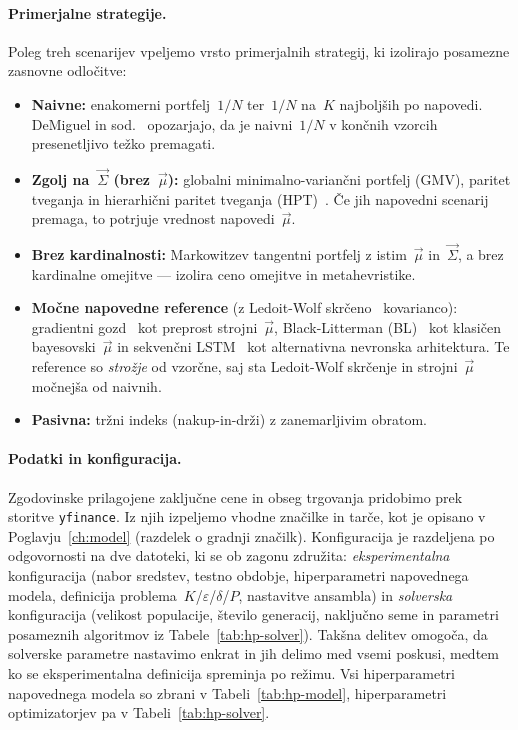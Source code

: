 \paragraph{Primerjalne strategije.}\label{sec:baselines}
Poleg treh scenarijev vpeljemo vrsto primerjalnih strategij, ki izolirajo posamezne zasnovne odločitve:
\begin{itemize}
  \item \textbf{Naivne:} enakomerni portfelj~$1/N$ ter~$1/N$ na~$K$ najboljših po napovedi. DeMiguel in sod.~\cite{demiguel2009} opozarjajo, da je naivni~$1/N$ v končnih vzorcih presenetljivo težko premagati.
  \item \textbf{Zgolj na~$\vec{\Sigma}$ (brez~$\vec{\mu}$):} globalni minimalno-variančni portfelj (GMV), paritet tveganja in hierarhični paritet tveganja (HPT)~\cite{lopezdeprado2016}. Če jih napovedni scenarij premaga, to potrjuje vrednost napovedi~$\vec{\mu}$.
  \item \textbf{Brez kardinalnosti:} Markowitzev tangentni portfelj z istim~$\vec{\mu}$ in~$\vec{\Sigma}$, a brez kardinalne omejitve --- izolira ceno omejitve in metahevristike.
  \item \textbf{Močne napovedne reference} (z Ledoit-Wolf skrčeno~\cite{ledoit2004} kovarianco): gradientni gozd~\cite{ke2017lightgbm} kot preprost strojni~$\vec{\mu}$, Black-Litterman (BL)~\cite{black1992} kot klasičen bayesovski~$\vec{\mu}$ in sekvenčni LSTM~\cite{hochreiter1997lstm} kot alternativna nevronska arhitektura. Te reference so \emph{strožje} od vzorčne, saj sta Ledoit-Wolf skrčenje in strojni~$\vec{\mu}$ močnejša od naivnih.
  \item \textbf{Pasivna:} tržni indeks (nakup-in-drži) z zanemarljivim obratom.
\end{itemize}

\paragraph{Podatki in konfiguracija.}\label{sec:config}
Zgodovinske prilagojene zaključne cene in obseg trgovanja pridobimo prek storitve \texttt{yfinance}. Iz njih izpeljemo vhodne značilke in tarče, kot je opisano v Poglavju~\ref{ch:model} (razdelek o gradnji značilk). Konfiguracija je razdeljena po odgovornosti na dve datoteki, ki se ob zagonu združita: \emph{eksperimentalna} konfiguracija (nabor sredstev, testno obdobje, hiperparametri napovednega modela, definicija problema~$K$/$\varepsilon$/$\delta$/$P$, nastavitve ansambla) in \emph{solverska} konfiguracija (velikost populacije, število generacij, naključno seme in parametri posameznih algoritmov iz Tabele~\ref{tab:hp-solver}). Takšna delitev omogoča, da solverske parametre nastavimo enkrat in jih delimo med vsemi poskusi, medtem ko se eksperimentalna definicija spreminja po režimu. Vsi hiperparametri napovednega modela so zbrani v Tabeli~\ref{tab:hp-model}, hiperparametri optimizatorjev pa v Tabeli~\ref{tab:hp-solver}.

